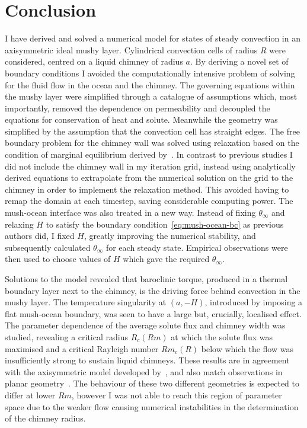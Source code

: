 \documentclass[11pt,twocolumn]{article}
\begin{document}
\section{Conclusion}
\label{sec:conclusion}
I have derived and solved a numerical model for states of steady convection in an axisymmetric ideal mushy layer. Cylindrical convection cells of radius $R$ were considered, centred on a liquid chimney of radius $a$. By deriving a novel set of boundary conditions I avoided the computationally intensive problem of solving for the fluid flow in the ocean and the chimney. The governing equations within the mushy layer were simplified through a catalogue of assumptions which, most importantly, removed the dependence on permeability and decoupled the equations for conservation of heat and solute. Meanwhile the geometry was simplified by the assumption that the convection cell has straight edges. The free boundary problem for the chimney wall was solved using relaxation based on the condition of marginal equilibrium derived by~\citet*{schulze-worster-99}. In contrast to previous studies I did not include the chimney wall in my iteration grid, instead using analytically derived equations to extrapolate from the numerical solution on the grid to the chimney in order to implement the relaxation method. This avoided having to remap the domain at each timestep, saving considerable computing power. The mush-ocean interface was also treated in a new way. Instead of fixing $\theta_\infty$ and relaxing $H$ to satisfy the boundary condition~\eqref{eq:mush-ocean-bc} as previous authors did, I fixed $H$, greatly improving the numerical stability, and subsequently calculated $\theta_\infty$ for each steady state. Empirical observations were then used to choose values of $H$ which gave the required $\theta_\infty$.

Solutions to the model revealed that baroclinic torque, produced in a thermal boundary layer next to the chimney, is the driving force behind convection in the mushy layer. The temperature singularity at $(a,-H)$, introduced by imposing a flat mush-ocean boundary, was seen to have a large but, crucially, localised effect. The parameter dependence of the average solute flux and chimney width was studied, revealing a critical radius $R_c(Rm)$ at which the solute flux was maximised and a critical Rayleigh number $Rm_c(R)$ below which the flow was insufficiently strong to sustain liquid chimneys. These results are in agreement with the axisymmetric model developed by~\citet*{rees-jones-worster-13}, and also match observations in planar geometry~\citet*{wells-et-al-13}. The behaviour of these two different geometries is expected to differ at lower $Rm$, however I was not able to reach this region of parameter space due to the weaker flow causing numerical instabilities in the determination of the chimney radius.
\end{document}
